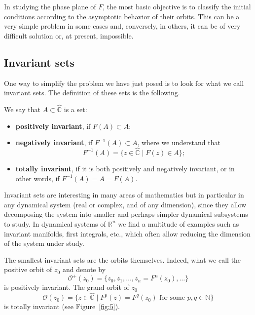 \documentclass[12pt, a4paper]{article}
\begin{document}
In studying the phase plane of $F$, the most basic objective is to classify the
initial conditions according to the asymptotic behavior of their orbits. This
can be a very simple problem in some cases and, conversely, in others, it can be
of very difficult solution or, at present, impossible.

\subsection{Invariant sets}

One way to simplify the problem we have just posed is to look for what we call
invariant sets. The definition of these sets is the following.

\begin{definition}
We say that $A \subset \hat{\mathbb{C}}$ is a set:
\begin{itemize}
    \item \textbf{positively invariant}, if $F(A) \subset A$;
    \item \textbf{negatively invariant}, if $F^{-1}(A) \subset A$, where we
    understand that
    \begin{equation*}
        F^{-1}(A)=\{z\in\hat{\mathbb{C}} \mid F(z)\in A\};
    \end{equation*}
    \item \textbf{totally invariant}, if it is both positively and negatively
    invariant, or in other words, if $F^{-1}(A)=A=F(A)$.
\end{itemize}
\end{definition}

Invariant sets are interesting in many areas of mathematics but in particular in
any dynamical system (real or complex, and of any dimension), since they allow
decomposing the system into smaller and perhaps simpler dynamical subsystems to
study. In dynamical systems of $\mathbb{R}^{n}$ we find a multitude of examples
such as invariant manifolds, first integrals, etc., which often allow reducing
the dimension of the system under study.

The smallest invariant sets are the orbits themselves. Indeed, what we call the
positive orbit of $z_{0}$ and denote by
\begin{equation*}
    \mathcal{O}^{+}(z_{0})=\{z_{0}, z_{1}, \dots, z_{n}=F^{n}(z_{0}), \dots\}
\end{equation*}
is positively invariant. The grand orbit of $z_{0}$
\begin{equation*}
    \mathcal{O}(z_{0})=\{z\in\hat{\mathbb{C}} \mid F^{p}(z)=F^{q}(z_{0}) \text{ for some } p,q\in\mathbb{N}\}
\end{equation*}
is totally invariant (see Figure~\ref{fig:5}).
\end{document}
